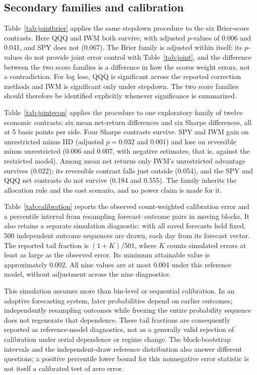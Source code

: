\subsection{Secondary families and calibration}\label{app:families}
Table~\ref{tab:jointbrier} applies the same stepdown procedure to the six Brier-score contrasts. Here QQQ and IWM both survive, with adjusted $p$-values of 0.006 and 0.041, and SPY does not (0.067). The Brier family is adjusted within itself: its $p$-values do not provide joint error control with Table~\ref{tab:joint}, and the difference between the two score families is a difference in how the scores weight errors, not a contradiction. For log loss, QQQ is significant across the reported correction methods and IWM is significant only under stepdown. The two score families should therefore be identified explicitly whenever significance is summarized.

Table~\ref{tab:jointecon} applies the procedure to one exploratory family of twelve economic contrasts: six mean net-return differences and six Sharpe differences, all at 5 basis points per side. Four Sharpe contrasts survive. SPY and IWM gain on unrestricted minus IID (adjusted $p=0.032$ and $0.001$) and lose on reversible minus unrestricted (0.006 and 0.007, with negative estimates, that is, against the restricted model). Among mean net returns only IWM's unrestricted advantage survives (0.022); its reversible contrast falls just outside (0.054), and the SPY and QQQ net contrasts do not survive (0.184 and 0.555). The family inherits the allocation rule and the cost scenario, and no power claim is made for it.

Table~\ref{tab:calibration} reports the observed count-weighted calibration error and a percentile interval from resampling forecast--outcome pairs in moving blocks. It also retains a separate simulation diagnostic: with all saved forecasts held fixed, 500 independent outcome sequences are drawn, each day from its forecast vector. The reported tail fraction is $(1+K)/501$, where $K$ counts simulated errors at least as large as the observed error. Its minimum attainable value is approximately 0.002. All nine values are at most 0.004 under this reference model, without adjustment across the nine diagnostics.

This simulation assumes more than bin-level or sequential calibration. In an adaptive forecasting system, later probabilities depend on earlier outcomes; independently resampling outcomes while freezing the entire probability sequence does not regenerate that dependence. These tail fractions are consequently reported as reference-model diagnostics, not as a generally valid rejection of calibration under serial dependence or regime change. The block-bootstrap intervals and the independent-draw reference distribution also answer different questions; a positive percentile lower bound for this nonnegative error statistic is not itself a calibrated test of zero error.


